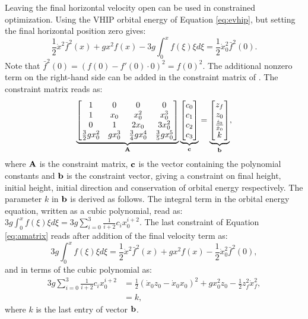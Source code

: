 Leaving the final horizontal velocity open can be used in constrained optimization. Using the \ac{VHIP} orbital energy of Equation \ref{eq:evhip}, but setting the final horizontal position zero gives:
\begin{equation}
    \frac{1}{2}\dot{x}^2\bar{f}^2(x)+gx^2f(x) - 3g\int_{0}^xf(\xi)\xi d\xi = \frac{1}{2}\dot{x}_0^2\bar{f}^2(0).
\end{equation}
Note that $\bar{f}^2(0)=(f(0)-f'(0) \cdot 0)^2=f(0)^2$. The additional nonzero term on the right-hand side can be added in the constraint matrix of \cite{koolen2016balance}. The constraint matrix reads as:
\begin{equation}
    \underbrace{\begin{bmatrix}1 & 0 & 0 & 0 \\ 
     1 & x_0 & x_0^2 & x_0^3\\
     0 & 1 & 2x_0 & 3x_0^2\\
     \frac{3}{2}gx_0^2 & gx_0^3 & \frac{3}{4}gx_0^4 & \frac{3}{5}gx_0^5\\
     \end{bmatrix}}_{\mathbf{A}}
     \underbrace{\begin{bmatrix}
     c_0\\
     c_1\\
     c_2\\
     c_3\\
     \end{bmatrix}}_{\mathbf{c}}=
     \underbrace{\begin{bmatrix}
     z_f\\
     z_0\\
     \frac{\dot{z}_0}{\dot{x}_0}\\
     k\\
     \end{bmatrix}}_{\mathbf{b}},
     \label{eq:amatrix}
\end{equation}
where $\mathbf{A}$ is the constraint matrix, $\mathbf{c}$ is the vector containing the polynomial constants and $\mathbf{b}$ is the constraint vector, giving a constraint on final height, initial height, initial direction and conservation of orbital energy respectively.
The parameter $k$ in $\mathbf{b}$ is derived as follows. The integral term in the orbital energy equation, written as a cubic polynomial, read as: $3g\int_{0}^xf(\xi)\xi d\xi = 3g\sum_{i=0}^3\frac{1}{i+2}c_ix_0^{i+2}$. The last constraint of Equation \ref{eq:amatrix} reads after addition of the final velocity term as:
\begin{equation}
		3g\int_{0}^xf(\xi)\xi d\xi =\frac{1}{2}\dot{x}^2\bar{f}^2(x)+gx^2f(x) - \frac{1}{2}\dot{x}_0^2\bar{f}^2(0),
\end{equation}
and in terms of the cubic polynomial as:
\begin{align}
	3g\sum_{i=0}^3\frac{1}{i+2}c_ix_0^{i+2}& = \frac{1}{2}(\dot{x}_0z_0-\dot{x}_0x_0)^2 + gx_0^2z_0 - \frac{1}{2}z_f^2\dot{x}_f^2,\\
	&=k,
\end{align}
where $k$ is the last entry of vector $\mathbf{b}$. 

